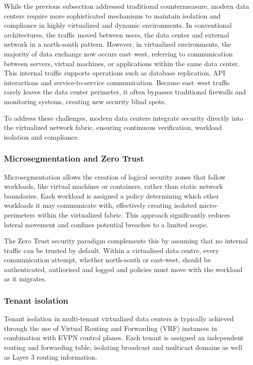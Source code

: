 While the previous subsection addressed traditional countermeasure, modern data centers require more sophisticated mechanisms to maintain isolation and compliance in highly virtualized and dynamic environments. 
In conventional architectures, the traffic moved between users, the data center and external network in a north-south pattern. However, in virtualized environments, the majority of data exchange now occurs east–west, referring to communication between servers, virtual machines, or applications within the same data center. This internal traffic supports operations such as database replication, API interactions and service-to-service communication. Because east–west traffic rarely leaves the data center perimeter, it often bypasses traditional firewalls and monitoring systems, creating new security blind spots.

To address these challenges, modern data centers integrate security directly into the virtualized network fabric, ensuring continuous verification, workload isolation and compliance.

\subsubsection{Microsegmentation and Zero Trust}

Microsegmentation allows the creation of logical security zones that follow workloads, like virtual machines or containers, rather than static network boundaries. Each workload is assigned a policy determining which other workloads it may communicate with, effectively creating isolated micro-perimeters within the virtualized fabric. This approach significantly reduces lateral movement and confines potential breaches to a limited scope.

The Zero Trust security paradigm complements this by assuming that no internal traffic can be trusted by default. Within a virtualised data centre, every communication attempt, whether north-south or east-west, should be authenticated, authorised and logged and policies must move with the workload as it migrates.

\subsubsection{Tenant isolation}

Tenant isolation in multi-tenant virtualized data centers is typically achieved through the use of Virtual Routing and Forwarding (VRF) instances in combination with EVPN control planes. Each tenant is assigned an independent routing and forwarding table, isolating broadcast and multicast domains as well as Layer 3 routing information. 


